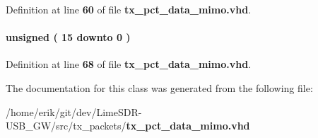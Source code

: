 Definition at line {\bf 60} of file {\bf tx\+\_\+pct\+\_\+data\+\_\+mimo.\+vhd}.

\paragraph[{wrreq\+\_\+cnt}]{ {\bfseries \textcolor{comment}{unsigned}\textcolor{vhdlchar}{ }\textcolor{vhdlchar}{(}\textcolor{vhdlchar}{ }\textcolor{vhdlchar}{ } \textcolor{vhdldigit}{15} \textcolor{vhdlchar}{ }\textcolor{keywordflow}{downto}\textcolor{vhdlchar}{ }\textcolor{vhdlchar}{ } \textcolor{vhdldigit}{0} \textcolor{vhdlchar}{ }\textcolor{vhdlchar}{)}\textcolor{vhdlchar}{ }} \hspace{0.3cm}{\ttfamily [Signal]}}\label{classtx__pct__data__mimo_1_1arch_a12f128afa70a54145414dc75b24e60c8}


Definition at line {\bf 68} of file {\bf tx\+\_\+pct\+\_\+data\+\_\+mimo.\+vhd}.



The documentation for this class was generated from the following file\+:\begin{DoxyCompactItemize}
\item 
/home/erik/git/dev/\+Lime\+S\+D\+R-\/\+U\+S\+B\+\_\+\+G\+W/src/tx\+\_\+packets/{\bf tx\+\_\+pct\+\_\+data\+\_\+mimo.\+vhd}\end{DoxyCompactItemize}
